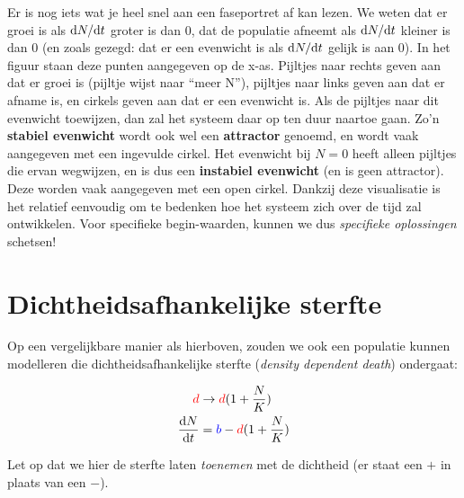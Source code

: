\documentclass[
  a4paper,
]{scrbook}
\theoremstyle{definition}
\theoremstyle{remark}
\begin{document}
Er is nog iets wat je heel snel aan een faseportret af kan lezen. We
weten dat er groei is als \(\mathchoice{\frac{\mathrm{d}N}
{\mathrm{d}t}}{\mathrm{d}N/\mathrm{d}t}
{\mathrm{d}N/\mathrm{d}t}
{\mathrm{d}N/\mathrm{d}t}\) groter is dan \(0\), dat de populatie
afneemt als \(\mathchoice{\frac{\mathrm{d}N}
{\mathrm{d}t}}{\mathrm{d}N/\mathrm{d}t}
{\mathrm{d}N/\mathrm{d}t}
{\mathrm{d}N/\mathrm{d}t}\) kleiner is dan \(0\) (en zoals gezegd: dat
er een evenwicht is als \(\mathchoice{\frac{\mathrm{d}N}
{\mathrm{d}t}}{\mathrm{d}N/\mathrm{d}t}
{\mathrm{d}N/\mathrm{d}t}
{\mathrm{d}N/\mathrm{d}t}\) gelijk is aan \(0\)). In het figuur staan
deze punten aangegeven op de x-as. Pijltjes naar rechts geven aan dat er
groei is (pijltje wijst naar ``meer N''), pijltjes naar links geven aan
dat er afname is, en cirkels geven aan dat er een evenwicht is. Als de
pijltjes naar dit evenwicht toewijzen, dan zal het systeem daar op ten
duur naartoe gaan. Zo'n \textbf{stabiel evenwicht} wordt ook wel een
\textbf{attractor} genoemd, en wordt vaak aangegeven met een ingevulde
cirkel. Het evenwicht bij \(N=0\) heeft alleen pijltjes die ervan
wegwijzen, en is dus een \textbf{instabiel evenwicht} (en is geen
attractor). Deze worden vaak aangegeven met een open cirkel. Dankzij
deze visualisatie is het relatief eenvoudig om te bedenken hoe het
systeem zich over de tijd zal ontwikkelen. Voor specifieke
begin-waarden, kunnen we dus \emph{specifieke oplossingen} schetsen!

\hypertarget{dichtheidsafhankelijke-sterfte}{%
\section{Dichtheidsafhankelijke
sterfte}\label{dichtheidsafhankelijke-sterfte}}

Op een vergelijkbare manier als hierboven, zouden we ook een populatie
kunnen modelleren die dichtheidsafhankelijke sterfte (\emph{density
dependent death}) ondergaat:

\begin{align}
    \color{red}d\color{black} & \rightarrow \color{red}d\color{black}(1+\frac{N}{K}) \\
    \frac{\mathrm{d}N}{\mathrm{d}t} &= \color{blue}b\color{black} - \color{red}d\color{black}(1+\frac{N}{K})
\end{align}

Let op dat we hier de sterfte laten \emph{toenemen} met de dichtheid (er
staat een \(+\) in plaats van een \(-\)).
\end{document}
